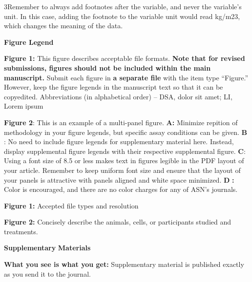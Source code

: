 \documentclass[conference]{IEEEtran}
\begin{document}
3Remember to always add footnotes after the variable, and never the variable's unit.  In this case, adding the footnote to the variable unit would read kg/m23, which changes the meaning of the data.

\textbf{Figure Legend}

\textbf{Figure 1: }This figure describes acceptable file formats.  \textbf{Note that for revised submissions, f}\textbf{igures should not be included within the main manuscript.} Submit each figure in \textbf{a separate file} with the item type ``Figure.'' However, keep the figure legends in the manuscript text so that it can be copyedited. Abbreviations (in alphabetical order) -- DSA, dolor sit amet; LI, Lorem ipsum

\textbf{Figure 2}: This is an example of a multi-panel figure. \textbf{A:} Minimize repition of methodology in your figure legends, but specific assay conditions can be given. \textbf{B}\textbf{ }: No need to include figure legends for supplementary material here. Instead, display supplemental figure legends with their respective supplemental figure. \textbf{C}: Using a font size of 8.5 or less makes text in figures legible in the PDF layout of your article. Remember to keep uniform font size and ensure that the layout of your panels is attractive with panels aligned and white space minimized. \textbf{D}\textbf{ }\textbf{:} Color is encouraged, and there are no color charges for any of ASN's journals.

\textbf{Figure 1}\textbf{:} Accepted file types and resolution

\textbf{Figure 2}\textbf{: }Concisely describe the animals, cells, or participants studied and treatments.

\textbf{Supplementary }\textbf{M}\textbf{aterials}

\textbf{What you see is what you get}\textbf{: }Supplementary material is published exactly as you send it to the journal.
\end{document}
